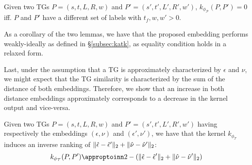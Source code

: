 \begin{lemma}
	Given two TGs $P=(s,t,L,R,w)$ and $P'=(s',t',L',R',w')$, $k_{\phi_{\mathcal{P}}}(P,P')=0$ iff. $P$ and $P'$ have a different set of labels with $t_f,w,w'>0$.
\end{lemma}

As a corollary of the two lemmas, we have that the proposed embedding performs weakly-ideally as defined in \S\ref{subsec:katk}, as equality condition holds in a relaxed form.

Last, under the assumption that a TG is approximately characterized by $\epsilon$ and $\nu$, we might expect that the TG similarity is characterized by the sum of the distance of both embeddings. Therefore, we show that an increase in both distance embeddings approximately corresponds to a decrease in the kernel output and vice-versa.

\begin{lemma}\label{lem:approxRank}
	Given two TGs $P=(s,t,L,R,w)$ and $P'=(s',t',L',R',w')$ having respectively the embeddings $(\epsilon,\nu)$ and $(\epsilon',\nu')$, we have that the kernel $k_{\phi_{\mathcal{T}}}$ induces an inverse ranking of $\|\hat{\epsilon}-\hat{\epsilon}'\|_{2}+\|\hat{\nu}-\hat{\nu}'\|_{2}$:
	$$k_{\phi_{\mathcal{T}}}(P,P')\appropto 2-(\norm{\hat{\epsilon}-\hat{\epsilon}'}{2}+\norm{\hat{\nu}-\hat{\nu}'}{2})$$
\end{lemma}

